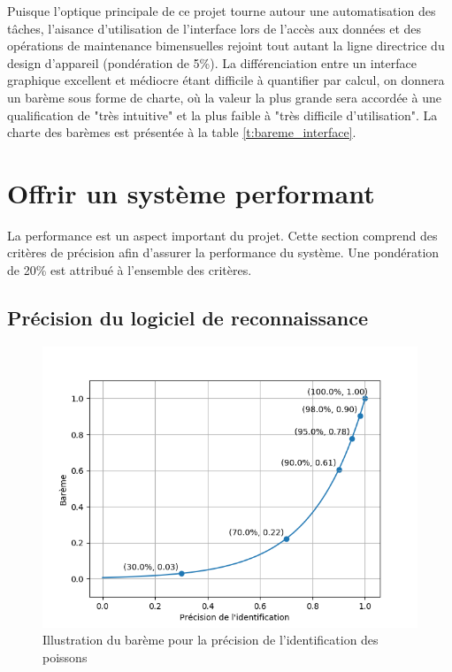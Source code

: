 Puisque l'optique principale de ce projet tourne autour une automatisation des tâches, l'aisance d'utilisation de l'interface lors de l'accès aux données et des opérations de maintenance bimensuelles rejoint tout autant la ligne directrice du design d'appareil (pondération de 5\%). La différenciation entre un interface graphique excellent et médiocre étant difficile à quantifier par calcul, on donnera un barème sous forme de charte, où la valeur la plus grande sera accordée à une qualification de "très intuitive" et la plus faible à "très difficile d'utilisation". La charte des barèmes est présentée à la table \ref{t:bareme_interface}. 


\section{Offrir un système performant}
La performance est un aspect important du projet. Cette section comprend des critères de précision afin d'assurer la performance du système. Une pondération de 20\% est attribué à l'ensemble des critères.

\subsection{Précision du logiciel de reconnaissance}

\begin{figure}
    \centering
    \includegraphics[width=\linewidth]{fig/bareme_ident.png}
    \caption{Illustration du barème pour la précision de l'identification des poissons}
    \label{fig:bareme_precision}
\end{figure}


